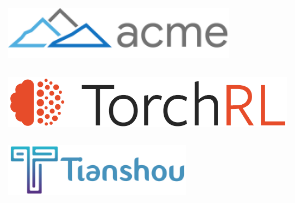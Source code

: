 \documentclass[
  letterpaper,
  DIV=11,
  numbers=noendperiod,
  oneside]{scrartcl}
\begin{document}
\begin{figure}
\begin{minipage}{0.33\linewidth}
\end{minipage}%
\newline
\begin{minipage}{0.50\linewidth}

\begin{figure}[H]

{\centering \includegraphics[width=\textwidth,height=0.52083in]{figs/package_acme.png}

}


\end{figure}%

\end{minipage}%
%
\begin{minipage}{0.50\linewidth}

\begin{figure}[H]

{\centering \includegraphics[width=\textwidth,height=0.52083in]{figs/package_torchrl.png}

}


\end{figure}%

\end{minipage}%
\newline
\begin{minipage}{0.50\linewidth}

\begin{figure}[H]

{\centering \includegraphics[width=\textwidth,height=0.52083in]{figs/package_tianshou.png}

}


\end{figure}%

\end{minipage}%
%
\begin{minipage}{0.50\linewidth}


\end{minipage}
\end{figure}
\end{document}
